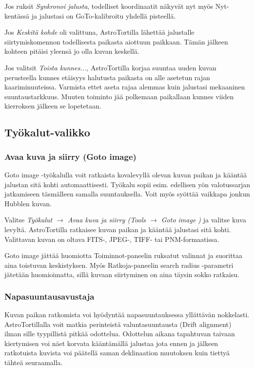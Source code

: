 \documentclass{article}
\begin{document}
Jos ruksit \emph{Synkronoi jalusta}, todelliset koordinaatit näkyvät nyt myös Nyt-kentässä ja jalustasi on GoTo-kalibroitu yhdellä pisteellä.

Jos \emph{Keskitä kohde} oli valittuna, AstroTortilla lähettää jalustalle siirtymiskomennon todellisesta paikasta aiottuun paikkaan. Tämän jälkeen kohteen pitäisi yleensä jo olla kuvan keskellä.

Jos valitsit \emph{Toista kunnes...}, AstroTortilla korjaa suuntaa uuden kuvan perusteella kunnes etäisyys halutusta paikasta on alle asetetun rajan kaariminuuteissa. Varmista ettet aseta rajaa alemmas kuin jalustasi mekaaninen suuntaustarkkuus. Muuten toiminto jää polkemaan paikallaan kunnes viiden kierroksen jälkeen se lopetetaan.

\subsection{Työkalut-valikko}

\subsubsection{Avaa kuva ja siirry (Goto image)}

Goto image -työkalulla voit ratkaista kovalevyllä olevan kuvan paikan ja kääntää jalustan sitä kohti automaattisesti.
Työkalu sopii esim. edellisen yön valotussarjan jatkamiseen täsmälleen samalla suuntauksella. Voit myös syöttää vaikkapa jonkun Hubblen kuvan.

Valitse \emph{Työkalut $\rightarrow$ Avaa kuva ja siirry (Tools $\rightarrow$ Goto image )} ja valitse kuva levyltä.
AstroTortilla ratkaisee kuvan paikan ja kääntää jalustasi sitä kohti. Valittavan kuvan on oltava FITS-, JPEG-, TIFF-
tai PNM-formaatissa.

Goto image jättää huomiotta Toiminnot-paneelin ruksatut valinnat ja suorittaa aina toistuvan keskistyksen.
Myös Ratkoja-paneelin search radius -parametri jätetään huomioimatta, sillä kuvaan siirtyminen on aina täysin sokko ratkaisu.

\subsubsection{Napasuuntausavustaja}

Kuvan paikan ratkomista voi hyödyntää napasuuntauksessa yllättävän nokkelasti.
AstroTortillalla voit matkia perinteistä valuntasuuntausta (Drift alignment) 
ilman sille tyypillistä pitkää odottelua. Odottelun aikana tapahtuvan taivaan
kiertymisen voi näet korvata kääntämällä jalustaa jota ennen ja jälkeen ratkotuista 
kuvista voi päätellä saman deklinaation muutoksen kuin tiettyä tähteä seuraamalla.
\end{document}
